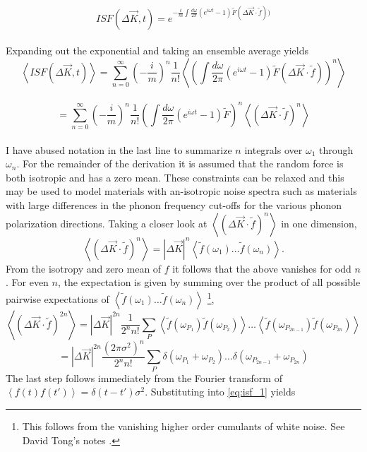 $$
ISF(\Delta \vec{K}, t) = e^{- \frac{i}{m} \int \frac{d\omega}{2\pi} \left(e^{i\omega t} - 1\right) \tilde{F} \left(\Delta \vec{K} \cdot \tilde{f}\right))}
$$
\\
Expanding out the exponential and taking an ensemble average yields
$$
\left<ISF(\Delta \vec{K}, t)\right> = \sum_{n=0}^{\infty} \left(- \frac{i}{m}\right)^n \frac{1}{n!} \left< \left( \int \frac{d\omega}{2\pi} \left(e^{i\omega t} - 1\right) \tilde{F} \left(\Delta \vec{K} \cdot \tilde{f}\right)\right)^n\right>
$$
\\
\begin{equation}
= \sum_{n=0}^{\infty} \left(- \frac{i}{m}\right)^n \frac{1}{n!} \left( \int \frac{d\omega}{2\pi} \left(e^{i\omega t} - 1\right) \tilde{F}\right)^n \left< \left(\Delta \vec{K} \cdot \tilde{f}\right)^n\right> \label{eq:isf_1}
\end{equation}
\\
I have abused notation in the last line to summarize $n$ integrals over $\omega_1$ through $\omega_n$. For the remainder of the derivation it is assumed that the random force is both isotropic and has a zero mean. These constraints can be relaxed and this may be used to model materials with an-isotropic noise spectra such as materials with large differences in the phonon frequency cut-offs for the various phonon polarization directions.
Taking a closer look at $\left< \left(\Delta \vec{K} \cdot \tilde{f}\right)^n\right>$ in one dimension,
$$
\left< \left(\Delta \vec{K} \cdot \tilde{f}\right)^n\right> = \left|\Delta \vec{K}\right|^n \left< \tilde{f}\left(\omega_1\right) \ldots \tilde{f}\left(\omega_n\right)\right>.
$$
From the isotropy and zero mean of $f$ it follows that the above vanishes for odd $n$. For even $n$, the expectation is given by summing over the product of all possible pairwise expectations of $\left< \tilde{f}\left(\omega_1\right) \ldots \tilde{f}\left(\omega_n\right) \right>$ \footnote{This follows from the vanishing higher order cumulants of white noise. See David Tong's notes \cite{Tong}.},
$$
\left< \left(\Delta \vec{K} \cdot \tilde{f}\right)^{2n}\right> = \left|\Delta \vec{K}\right|^{2n} \frac{1}{2^nn!} \sum_P \left< \tilde{f}\left(\omega_{P_1}\right) \tilde{f}\left(\omega_{P_2}\right)\right> \ldots \left< \tilde{f}\left(\omega_{P_{2n-1}}\right) \tilde{f}\left(\omega_{P_{2n}}\right)\right>
$$
$$
= \left|\Delta \vec{K}\right|^{2n} \frac{\left(2\pi\sigma^2\right)^n}{2^nn!} \sum_P \delta\left(\omega_{P_1} + \omega_{P_2}\right) \ldots \delta\left(\omega_{P_{2n-1}} + \omega_{P_{2n}}\right)
$$
The last step follows immediately from the Fourier transform of $\left<f(t)f(t')\right>=\delta(t-t')\sigma^2$. Substituting into \ref{eq:isf_1} yields
